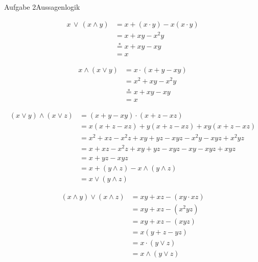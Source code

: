 \begin{frame}[allowframebreaks]{Aufgabe 2}{Aussagenlogik}
  \begin{solutionnoinc}
    \begin{align*}
      x\,\vee\,\left(x\wedge y\right)&=x+(x\cdot y)-x(x\cdot y)\\ 
      &{=x+x y-x^{2}y}\\ 
      &{\overset{*}{=}x+x y-x y}\\ 
      &{=x}
    \end{align*}
  \end{solutionnoinc}
  \begin{solutionnoinc}
    \begin{align*}
      x\wedge(x\vee y)&=x\cdot(x+y-x y)\\ 
      &=x^{2}+x y-x^{2}y\\ 
      &\overset{*}{=}x+x y-x y\\ 
      &=x
    \end{align*}
  \end{solutionnoinc}
  \begin{solutionnoinc}    
    \begin{align*}
      (x\vee y)\land(x\vee z)&=(x+y-x y)\cdot(x+z-x z)\\
      &=x(x+z-xz)+y(x+z-xz)+xy(x+z - x z)\\
      &=x^2+xz-x^2z+xy+yz-xyz-x^2y-xyz+x^2yz\\
      &=x+xz-x^2z+xy+yz-xyz-xy-xyz+xyz\\
      &=x+yz-xyz\\
      &=x+(y\wedge z)-x\wedge(y\wedge z)\\
      &=x\vee(y\wedge z)
    \end{align*}
  \end{solutionnoinc}
  \begin{solution}
    \begin{align*}
      (x\wedge y)\vee(x\wedge z)&=x y+x z-(x y\cdot x z)\\ 
      &{{}=x y+x z-(x^{2}y z)}\\ 
      &{{}=x y+x z-(x y z)}\\ 
      &{{}=x(y+z - yz)}\\ 
      &=x \cdot (y\vee z)\\
      &=x \wedge(y\vee z)
    \end{align*}
  \end{solution}
\end{frame}
